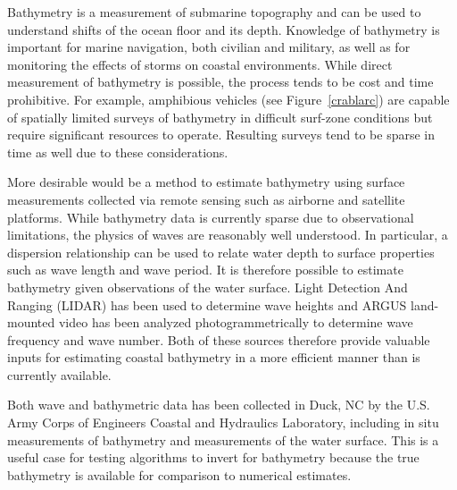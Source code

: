 Bathymetry is a measurement of submarine topography and can be used to understand shifts of the ocean floor and its depth. Knowledge of bathymetry is important for marine navigation, both civilian and military, as well as for monitoring the effects of storms on coastal environments. While direct measurement of bathymetry is possible, the process tends to be cost and time prohibitive. For example, amphibious vehicles (see Figure~\ref{crablarc}) are capable of spatially limited surveys of bathymetry in difficult surf-zone conditions but require significant resources to operate. Resulting surveys tend to be sparse in time as well due to these considerations. 

More desirable would be a method to estimate bathymetry using surface measurements collected via remote sensing such as airborne and satellite platforms. While bathymetry data is currently sparse due to observational limitations, the physics of waves are reasonably well understood. In particular, a dispersion relationship can be used to relate water depth to surface properties such as wave length and wave period. It is therefore possible to estimate bathymetry given observations of the water surface. Light Detection And Ranging (LIDAR) has been used to determine wave heights and ARGUS land-mounted video has been analyzed photogrammetrically to determine wave frequency and wave number. Both of these sources therefore provide valuable inputs for estimating coastal bathymetry in a more efficient manner than is currently available.


Both wave and bathymetric data has been collected in Duck, NC by the U.S. Army Corps of Engineers Coastal and Hydraulics Laboratory, including in situ measurements of bathymetry and measurements of the water surface. This is a useful case for testing algorithms to invert for bathymetry because the true bathymetry is available for comparison to numerical estimates.
